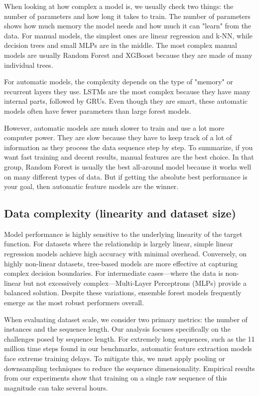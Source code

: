 \documentclass[12pt]{article}
\begin{document}
When looking at how complex a model is, we usually check two things: the number of parameters and how long it takes to train.
The number of parameters shows how much memory the model needs and how much it can "learn" from the data.
For manual models, the simplest ones are linear regression and k-NN, while decision trees and small MLPs are in the middle.
The most complex manual models are usually Random Forest and XGBoost because they are made of many individual trees.

For automatic models, the complexity depends on the type of "memory" or recurrent layers they use.
LSTMs are the most complex because they have many internal parts, followed by GRUs.
Even though they are smart, these automatic models often have fewer parameters than large forest models.

However, automatic models are much slower to train and use a lot more computer power.
They are slow because they have to keep track of a lot of information as they process the data sequence step by step.
To summarize, if you want fast training and decent results, manual features are the best choice.
In that group, Random Forest is usually the best all-around model because it works well on many different types of data.
But if getting the absolute best performance is your goal, then automatic feature models are the winner.

\subsection{Data complexity (linearity and dataset size)}
Model performance is highly sensitive to the underlying linearity of the target function.
For datasets where the relationship is largely linear, simple linear regression models achieve high accuracy with minimal overhead.
Conversely, on highly non-linear datasets, tree-based models are more effective at capturing complex decision boundaries.
For intermediate cases—where the data is non-linear but not excessively complex—Multi-Layer Perceptrons (MLPs) provide a balanced solution.
Despite these variations, ensemble forest models frequently emerge as the most robust performers overall.

When evaluating dataset scale, we consider two primary metrics: the number of instances and the sequence length.
Our analysis focuses specifically on the challenges posed by sequence length.
For extremely long sequences, such as the 11 million time steps found in our benchmarks, automatic feature extraction models face extreme training delays.
To mitigate this, we must apply pooling or downsampling techniques to reduce the sequence dimensionality.
Empirical results from our experiments show that training on a single raw sequence of this magnitude can take several hours.
\end{document}
